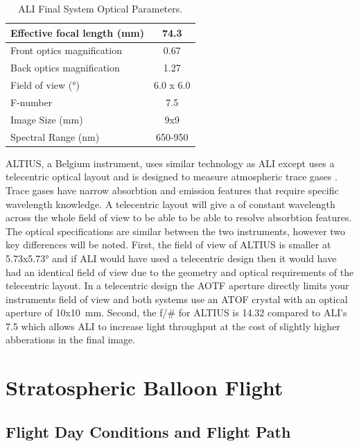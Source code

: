 \documentclass[12pt]{article}
\begin{document}
\begin{table}[!ht]
    \begin{center}
    \begin{tabular}{|l|c|}
      \hline
      Effective focal length (mm) & 74.3 \\
      \hline
      Front optics magnification & 0.67 \\
      \hline
      Back optics magnification & 1.27 \\
      \hline
      Field of view (\si{\degree}) & 6.0 x 6.0 \\
      \hline
      F-number & 7.5 \\
      \hline
      Image Size (mm) & 9x9\\
      \hline
      Spectral Range (nm) & 650-950\\
      \hline
    \end{tabular}
    \end{center}
    \caption{ALI Final System Optical Parameters.}
    \label{tab:3.2:ALISystemParameters}
\end{table}

 ALTIUS, a Belgium instrument, uses similar technology as ALI except uses a telecentric optical layout and is designed to measure atmospheric trace gases \citep{Dekemper2012}. Trace gases have narrow absorbtion and emission features that require specific wavelength knowledge. A telecentric layout will give a of constant wavelength across the whole field of view to be able to be able to resolve absorbtion features. The optical specifications are similar between the two instruments, however two key differences will be noted. First, the field of view of ALTIUS is smaller at 5.73x5.73\si{\degree} and if ALI would have used a telecentric design then it would have had an identical field of view due to the geometry and optical requirements of the telecentric layout. In a telecentric design the AOTF aperture directly limits your instruments field of view and both systems use an ATOF crystal with an optical aperture of 10x10~mm. Second, the f/\# for ALTIUS is 14.32 compared to ALI's 7.5 which allows ALI to increase light throughput at the cost of slightly higher abberations in the final image.

\section{Stratospheric Balloon Flight}

\subsection{Flight Day Conditions and Flight Path}
\end{document}
